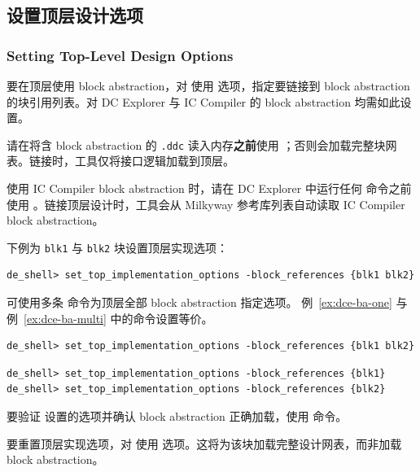 \subsection{设置顶层设计选项}
\subsubsection*{Setting Top-Level Design Options}

要在顶层使用 block abstraction，对  使用  选项，指定要链接到 block abstraction 的块引用列表。对 DC Explorer 与 IC Compiler 的 block abstraction 均需如此设置。

请在将含 block abstraction 的 \texttt{.ddc} 读入内存\textbf{之前}使用 ；否则会加载完整块网表。链接时，工具仅将接口逻辑加载到顶层。

使用 IC Compiler block abstraction 时，请在 DC Explorer 中运行任何  命令之前使用 。链接顶层设计时，工具会从 Milkyway 参考库列表自动读取 IC Compiler block abstraction。

下例为 \texttt{blk1} 与 \texttt{blk2} 块设置顶层实现选项：
\begin{lstlisting}
de_shell> set_top_implementation_options -block_references {blk1 blk2}
\end{lstlisting}

可使用多条  命令为顶层全部 block abstraction 指定选项。
例~\ref{ex:dce-ba-one} 与例~\ref{ex:dce-ba-multi} 中的命令设置等价。

\begin{lstlisting}[caption={在一条命令中为 Block Abstraction 指定选项},label={ex:dce-ba-one}]
de_shell> set_top_implementation_options -block_references {blk1 blk2}
\end{lstlisting}

\begin{lstlisting}[caption={用多条命令为 Block Abstraction 指定选项},label={ex:dce-ba-multi}]
de_shell> set_top_implementation_options -block_references {blk1}
de_shell> set_top_implementation_options -block_references {blk2}
\end{lstlisting}

要验证  设置的选项并确认 block abstraction 正确加载，使用  命令。

要重置顶层实现选项，对  使用  选项。这将为该块加载完整设计网表，而非加载 block abstraction。

